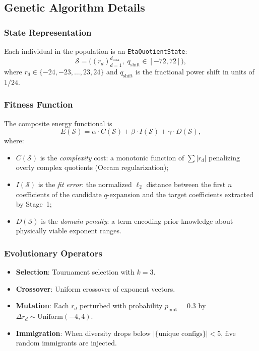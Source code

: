 \subsection{Genetic Algorithm Details}

\subsubsection{State Representation}

Each individual in the population is an
\texttt{EtaQuotientState}:
\begin{equation}
  \mathcal{S} = \bigl(
    (r_d)_{d=1}^{d_{\max}},\;
    q_{\mathrm{shift}} \in [-72, 72]
  \bigr),
\end{equation}
where $r_d \in \{-24, -23, \ldots, 23, 24\}$ and
$q_{\mathrm{shift}}$ is the fractional power shift
in units of $1/24$.

\subsubsection{Fitness Function}

The composite energy functional is
\begin{equation}
  \label{eq:energy}
  E(\mathcal{S}) = \alpha \cdot C(\mathcal{S})
  + \beta \cdot I(\mathcal{S})
  + \gamma \cdot D(\mathcal{S}),
\end{equation}
where:
\begin{itemize}
  \item $C(\mathcal{S})$ is the \emph{complexity} cost:
        a monotonic function of $\sum |r_d|$ penalizing
        overly complex quotients (Occam regularization);
  \item $I(\mathcal{S})$ is the \emph{fit error}: the
        normalized $\ell_2$ distance between the first
        $n$ coefficients of the candidate $q$-expansion
        and the target coefficients extracted by Stage~1;
  \item $D(\mathcal{S})$ is the \emph{domain penalty}:
        a term encoding prior knowledge about physically
        viable exponent ranges.
\end{itemize}

\subsubsection{Evolutionary Operators}

\begin{itemize}
  \item \textbf{Selection}: Tournament selection with $k=3$.
  \item \textbf{Crossover}: Uniform crossover of exponent vectors.
  \item \textbf{Mutation}: Each $r_d$ perturbed with probability
        $p_{\mathrm{mut}} = 0.3$ by $\Delta r_d \sim \mathrm{Uniform}(-4, 4)$.
  \item \textbf{Immigration}: When diversity drops below
        $|\{\text{unique configs}\}| < 5$, five random
        immigrants are injected.
\end{itemize}

